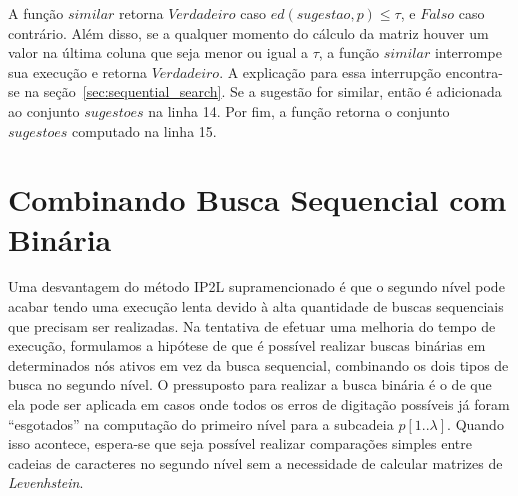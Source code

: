 A função $similar$ retorna $Verdadeiro$ caso $ed(sugestao, p) \leq \tau$, e $Falso$ caso contrário. Além disso, se a qualquer momento do cálculo da matriz houver um valor na última coluna que seja menor ou igual a $\tau$, a função $similar$ interrompe sua execução e retorna $Verdadeiro$. A explicação para essa interrupção encontra-se na seção~\ref{sec:sequential_search}. Se a sugestão for similar, então é adicionada ao conjunto $sugestoes$ na linha 14. Por fim, a função retorna o conjunto $sugestoes$ computado na linha 15.



\section{Combinando Busca Sequencial com Binária}
\label{sec:IP2LB}

Uma desvantagem do método IP2L supramencionado é que o segundo nível pode acabar tendo uma execução lenta devido à alta quantidade de buscas sequenciais que precisam ser realizadas. Na tentativa de efetuar uma melhoria do tempo de execução, formulamos a hipótese de que é possível realizar buscas binárias em determinados nós ativos em vez da busca sequencial, combinando os dois tipos de busca no segundo nível. O pressuposto para realizar a busca binária é o de que ela pode ser aplicada em casos onde todos os erros de digitação possíveis já foram ``esgotados'' na computação do primeiro nível para a subcadeia $p[1..\lambda]$. Quando isso acontece, espera-se que seja possível realizar comparações simples entre cadeias de caracteres no segundo nível sem a necessidade de calcular matrizes de \textit{Levenhstein}.

